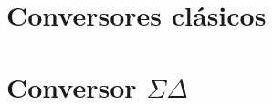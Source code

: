







\tableofcontents
\newpage


\section{Conversores clásicos}
	\label{ADA}
	

\pagebreak
\section{Conversor $\Sigma \Delta$}
	\label{Ejercicio-3}
	

